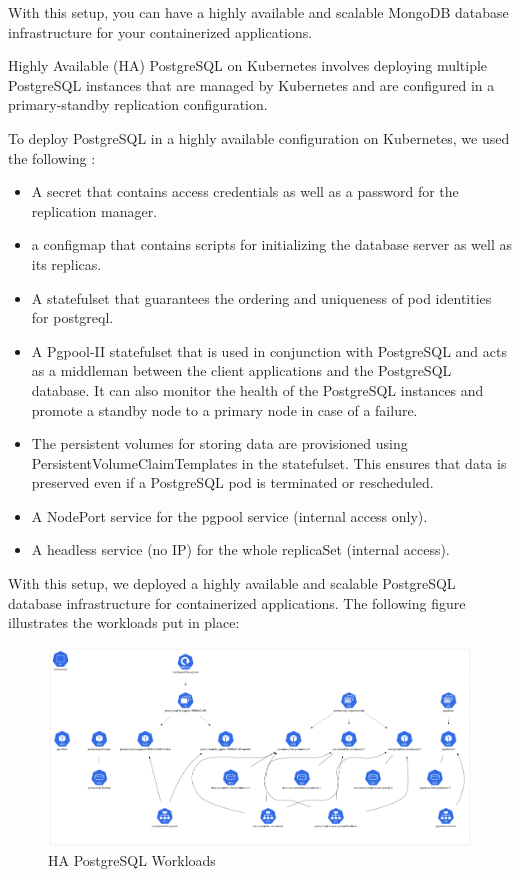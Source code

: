 With this setup, you can have a highly available and scalable MongoDB database infrastructure for your containerized applications. 

 

Highly Available (HA) PostgreSQL on Kubernetes involves deploying multiple PostgreSQL instances that are managed by Kubernetes and are configured in a primary-standby replication configuration.  

To deploy PostgreSQL in a highly available configuration on Kubernetes, we used the following : 
\begin{itemize}[label={--}]
\item A secret that contains access credentials as well as a password for the replication manager. 
\item a configmap that contains scripts for initializing the database server as well as its replicas. 
\item A statefulset that guarantees the ordering and uniqueness of pod identities for postgreql. 
\item A Pgpool-II statefulset that is used in conjunction with PostgreSQL and acts as a middleman between the client applications and the PostgreSQL database. It can also monitor the health of the PostgreSQL instances and promote a standby node to a primary node in case of a failure. 
\item The persistent volumes for storing data are provisioned using PersistentVolumeClaimTemplates in the statefulset. This ensures that data is preserved even if a PostgreSQL pod is terminated or rescheduled. 
\item A NodePort service for the pgpool service (internal access only). 
\item  A headless service (no IP) for the whole replicaSet (internal access). 
\end{itemize}

With this setup, we deployed a highly available and scalable PostgreSQL database infrastructure for containerized applications. The following figure illustrates the workloads put in place: 

\begin{figure}[H]\centering
\includegraphics[width=1.0\textwidth,angle=00]{assets/f37.png}
\caption{HA PostgreSQL Workloads}
\label{fig:f37}
\end{figure}

